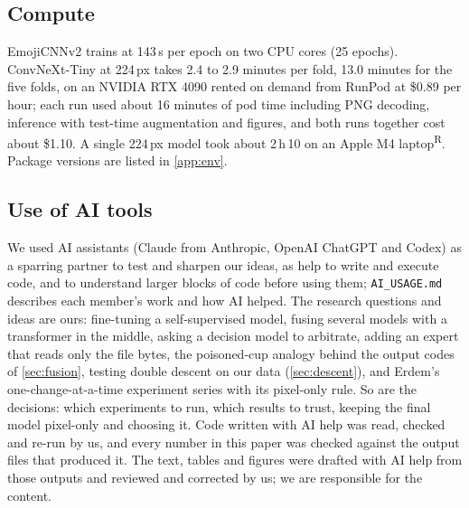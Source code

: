 \documentclass[11pt,a4paper]{article}
\newcommand{\rep}{\textsuperscript{\textcolor{reported}{\sffamily\scriptsize R}}}
\newcommand{\code}[1]{\texttt{#1}}
\begin{document}
\subsection{Compute}
EmojiCNNv2 trains at 143\,s per epoch on two CPU cores (25 epochs). ConvNeXt-Tiny at 224\,px takes 2.4 to 2.9 minutes per fold, 13.0 minutes for the five folds, on an NVIDIA RTX 4090 rented on demand from RunPod at \$0.89 per hour; each run used about 16 minutes of pod time including PNG decoding, inference with test-time augmentation and figures, and both runs together cost about \$1.10. A single 224\,px model took about 2\,h\,10 on an Apple M4 laptop\rep. Package versions are listed in \cref{app:env}.

\subsection{Use of AI tools}
We used AI assistants (Claude from Anthropic, OpenAI ChatGPT and Codex) as a sparring partner to test and sharpen our ideas, as help to write and execute code, and to understand larger blocks of code before using them; \code{AI\_USAGE.md} describes each member's work and how AI helped. The research questions and ideas are ours: fine-tuning a self-supervised model, fusing several models with a transformer in the middle, asking a decision model to arbitrate, adding an expert that reads only the file bytes, the poisoned-cup analogy behind the output codes of \cref{sec:fusion}, testing double descent on our data (\cref{sec:descent}), and Erdem's one-change-at-a-time experiment series with its pixel-only rule. So are the decisions: which experiments to run, which results to trust, keeping the final model pixel-only and choosing it. Code written with AI help was read, checked and re-run by us, and every number in this paper was checked against the output files that produced it. The text, tables and figures were drafted with AI help from those outputs and reviewed and corrected by us; we are responsible for the content.

\end{document}
